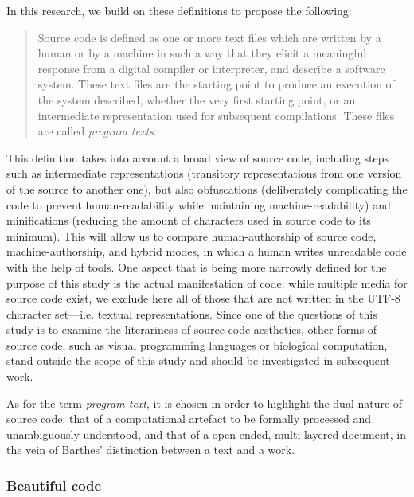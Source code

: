 In this research, we build on these definitions to propose the following:

\begin{quote}
    Source code is defined as one or more text files which are written by a human or by a machine in such a way that they elicit a meaningful response from a digital compiler or interpreter, and describe a software system. These text files are the starting point to produce an execution of the system described, whether the very first starting point, or an intermediate representation used for subsequent compilations. These files are called \emph{program texts}.
\end{quote}

This definition takes into account a broad view of source code, including steps such as intermediate representations (transitory representations from one version of the source to another one), but also obfuscations (deliberately complicating the code to prevent human-readability while maintaining machine-readability) and minifications (reducing the amount of characters used in source code to its minimum). This will allow us to compare human-authorship of source code, machine-authorship, and hybrid modes, in which a human writes unreadable code with the help of tools. One aspect that is being more narrowly defined for the purpose of this study is the actual manifestation of code: while multiple media for source code exist, we exclude here all of those that are not written in the UTF-8 character set—i.e. textual representations. Since one of the questions of this study is to examine the literariness of source code aesthetics, other forms of source code, such as visual programming languages or biological computation, stand outside the scope of this study and should be investigated in subsequent work.

As for the term \emph{program text}, it is chosen in order to highlight the dual nature of source code: that of a computational artefact to be formally processed and unambiguously understood, and that of a open-ended, multi-layered document, in the vein of Barthes' distinction between a text and a work\cite{barthes_bruissement_1984}.

\subsubsection{Beautiful code}

